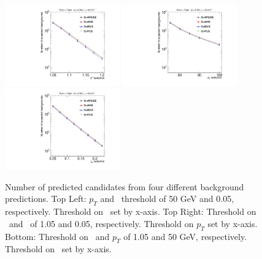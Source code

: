 \begin{figure}
 \begin{center}
  \includegraphics[clip=true, trim=0.0cm 0cm 2.8cm 0cm,width=0.44\textwidth]{figures/tkmu/Systematics_Data8TeV_TOF_Value}
  \includegraphics[clip=true, trim=0.0cm 0cm 2.8cm 0cm,width=0.44\textwidth]{figures/tkmu/Systematics_Data8TeV_P_Value} \\
  \includegraphics[clip=true, trim=0.0cm 0cm 2.8cm 0cm,width=0.44\textwidth]{figures/tkmu/Systematics_Data8TeV_I_Value}
 \end{center}
 \caption[Number of predicted candidates from four different background predictions in the \tktof\ analysis]
{Number of predicted candidates from four different background predictions. Top Left: $p_T$ and \ias\ threshold of 50 GeV and 0.05, respectively.
Threshold on \invbeta\ set by x-axis. Top Right: Threshold on \invbeta\  and \ias\ of 1.05 and 0.05, respectively. Threshold on $p_T$ set by x-axis.
Bottom: Threshold on \invbeta\ and $p_T$ of 1.05 and 50 GeV, respectively. Threshold on \ias\ set by x-axis. }
\label{fig:TkMuMultPred}
\end{figure}

